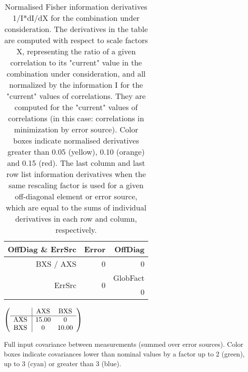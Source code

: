 \begin{table}[H]
\scriptsize
\begin{center}
\renewcommand{\arraystretch}{1.1}
\begin{tabular}{|r|r|r|}
\hline
 OffDiag \& ErrSrc & {\tiny Error} & OffDiag\\
\hline
BXS / AXS &  0 &  0 \\
\hline
\multirow{2}{*}{ErrSrc} & \multirow{2}{*}{ 0} & GlobFact\\
 & &  0 \\
\hline
\end{tabular}
\renewcommand{\arraystretch}{1}
\caption{Normalised Fisher information derivatives 1/I*dI/dX for the combination under consideration. The derivatives in the table are computed with respect to scale factors X, representing the ratio of a given correlation to its "current" value in the combination under consideration, and all normalized by the information I for the "current" values of correlations. They are computed for the "current" values of correlations (in this case: correlations in minimization by error source). Color boxes indicate normalised derivatives greater than 0.05 (yellow), 0.10 (orange) and 0.15 (red). The last column and last row list information derivatives when the same rescaling factor is used for a given off-diagonal element or error source, which are equal to the sums of individual derivatives in each row and column, respectively.}
\end{center}
\end{table}
\begin{table}[H]
\scriptsize
\begin{center}
\renewcommand{\arraystretch}{1.1}
\begin{math}\left(\begin{array}{c|cc}
 & \mathrm{AXS} & 
\mathrm{BXS} \\
\hline
\mathrm{AXS} \hspace*{2pt} &      15.00 &  0 \\
\mathrm{BXS} \hspace*{2pt} &  0 &      10.00 \\
\end{array}\right)\end{math}
\caption{Full input covariance between measurements (summed over error sources). Color boxes indicate covariances lower than nominal values by a factor up to 2 (green), up to 3 (cyan) or greater than 3 (blue).}
\renewcommand{\arraystretch}{1}
\end{center}
\end{table}
